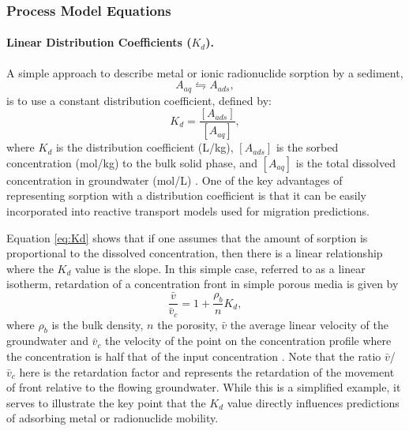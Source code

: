 

\subsubsection{Process Model Equations}

\paragraph{Linear Distribution Coefficients ($K_d$).}
A simple approach to describe metal or ionic radionuclide sorption by a sediment,
\begin{equation}
  A_{aq}\leftrightharpoons A_{ads},
\end{equation}
is to use a constant distribution coefficient, defined by:
\begin{equation} \label{eq:Kd} 
  K_d = \frac{[A_{ads}]}{[A_{aq}]},
\end{equation} 
where $K_d$ is the distribution coefficient (L/kg), $[A_{ads}]$ is the sorbed concentration (mol/kg) to the bulk solid phase, 
and $[A_{aq}]$ is the total dissolved concentration in groundwater (mol/L) \citep{davis-1990}.  
One of the key advantages of representing sorption with a distribution coefficient is that it can be easily incorporated 
into reactive transport models used for migration predictions. 

Equation \eqref{eq:Kd} shows that if one assumes that the amount of sorption is proportional to the dissolved concentration, 
then there is a linear relationship where the $K_d$ value is the slope. 
In this simple case, referred to as a linear isotherm, retardation of a concentration  front in simple porous media is given by
%
\begin{equation}  \label{eq:KdRetardation}
  \frac{\bar{v}}{\bar{v}_{c} } 
  =
  1+\frac{\rho _{b} }{n} K_{d}  ,
\end{equation}
where $\rho_b$ is the bulk density, 
$n$ the porosity, 
$\bar{v}$ the average linear velocity of the groundwater and 
$\bar{v}_{c} $ the velocity of the point on the concentration profile 
where the concentration is half that of the input concentration \citep{freeze-1979}. 
Note that the ratio $\bar{v}$/$\bar{v}_{c} $ here is the retardation factor and represents 
the retardation of the movement of front relative to the flowing groundwater. 
While this is a simplified example, it serves to illustrate the key point that the $K_d$ value 
directly influences predictions of adsorbing metal or radionuclide mobility. 

